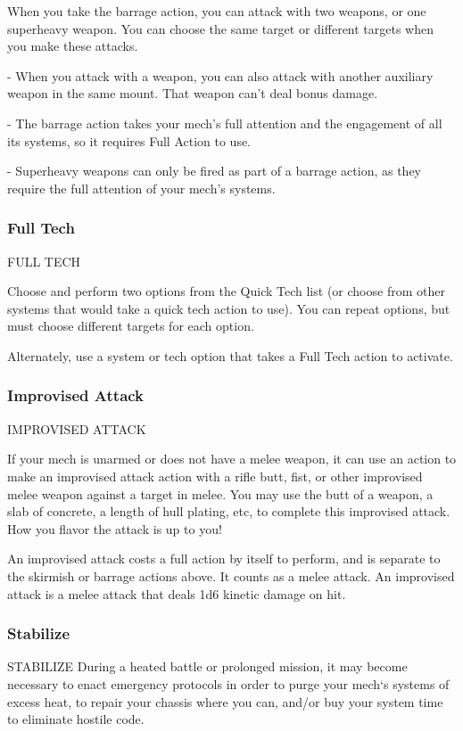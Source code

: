 When you take the barrage action, you can attack with two weapons, or one superheavy
weapon. You can choose the same target or different targets when you make these attacks.

        	- When you attack with a weapon, you can also attack with another auxiliary weapon in
        the same mount. That weapon can’t deal bonus damage.

        	- The barrage action takes your mech’s full attention and the engagement of all its
        systems, so it requires Full Action to use.

        	- Superheavy weapons can only be fired as part of a barrage action, as they require the
        full attention of your mech’s systems.

\subsubsection{Full Tech}
                                              FULL TECH

Choose and perform two options from the Quick Tech list (or choose from other systems that
would take a quick tech action to use). You can repeat options, but must choose different targets
for each option.


Alternately, use a system or tech option that takes a Full Tech action to activate.

\subsubsection{Improvised Attack}

                                      IMPROVISED ATTACK

If your mech is unarmed or does not have a melee weapon, it can use an action to make an
improvised attack action with a rifle butt, fist, or other improvised melee weapon against a target
in melee. You may use the butt of a weapon, a slab of concrete, a length of hull plating, etc, to
complete this improvised attack. How you flavor the attack is up to you!


An improvised attack costs a full action by itself to perform, and is separate to the skirmish or
barrage actions above. It counts as a melee attack. An improvised attack is a melee attack that
deals 1d6 kinetic damage on hit.

\subsubsection{Stabilize}
                                              STABILIZE
During a heated battle or prolonged mission, it may become necessary to enact emergency
protocols in order to purge your mech‘s systems of excess heat, to repair your chassis where you
can, and/or buy your system time to eliminate hostile code.

